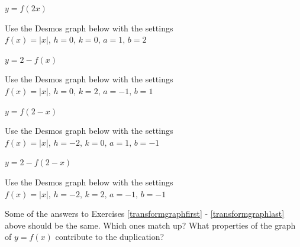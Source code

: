 \documentclass{ximera}
\begin{document}
\begin{question}
\begin{problem}
$y = f(2x)$

\begin{solution}
Use the Desmos graph below with the settings $f(x)=|x|,\,h=0,\,k=0,\,a=1,\,b=2$

\begin{center} 
\end{center}
\end{solution} 
\end{problem}

\begin{problem}
$y = 2 - f(x)$

\begin{solution}
Use the Desmos graph below with the settings $f(x)=|x|,\,h=0,\,k=2,\,a=-1,\,b=1$

\begin{center} 
\end{center}
\end{solution} 
\end{problem}

\begin{problem}
$y = f(2-x)$

\begin{solution}
Use the Desmos graph below with the settings $f(x)=|x|,\,h=-2,\,k=0,\,a=1,\,b=-1$

\begin{center} 
\end{center}
\end{solution} 
\end{problem}

\begin{problem}\label{transformgraphlast}
$y = 2-f(2-x)$

\begin{solution}
Use the Desmos graph below with the settings $f(x)=|x|,\,h=-2,\,k=2,\,a=-1,\,b=-1$

\begin{center} 
\end{center}
\end{solution} 
\end{problem} 

\end{question}

\begin{problem}\label{somegraphsthesame}
Some of the answers to Exercises \ref{transformgraphfirst} - \ref{transformgraphlast} above should be the same.  Which ones match up?  What properties of the graph of $y=f(x)$ contribute to the duplication?

\end{problem} 
\end{document}
